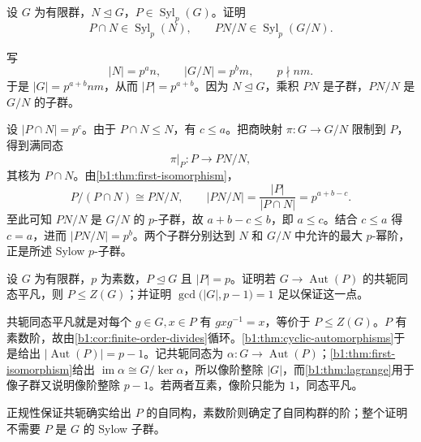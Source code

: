 \begin{exercise}\label{b1:ex:05-sylow-normal-quotient}
	设 \(G\) 为有限群，\(N\trianglelefteq G\)，\(P\in\operatorname{Syl}_p(G)\)。证明
	\[
		P\cap N\in\operatorname{Syl}_p(N),\qquad PN/N\in\operatorname{Syl}_p(G/N).
	\]
\end{exercise}
\begin{solution}
	写
	\[
		|N|=p^a n,\qquad |G/N|=p^b m, \qquad p\nmid nm.
	\]
	于是 \(|G|=p^{a+b}nm\)，从而 \(|P|=p^{a+b}\)。因为 \(N\trianglelefteq G\)，乘积 \(PN\) 是子群，\(PN/N\) 是 \(G/N\) 的子群。

	设 \(|P\cap N|=p^c\)。由于 \(P\cap N\leq N\)，有 \(c\leq a\)。把商映射 \(\pi:G\rightarrow G/N\) 限制到 \(P\)，得到满同态
	\[
		\pi|_P:P\longrightarrow PN/N,
	\]
	其核为 \(P\cap N\)。由\cref{b1:thm:first-isomorphism}，
	\[
		P/(P\cap N)\cong PN/N, \qquad |PN/N|=\frac{|P|}{|P\cap N|}=p^{a+b-c}.
	\]
	至此可知 \(PN/N\) 是 \(G/N\) 的 \(p\)-子群，故 \(a+b-c\leq b\)，即 \(a\leq c\)。结合 \(c\leq a\) 得 \(c=a\)，进而 \(|PN/N|=p^b\)。两个子群分别达到 \(N\) 和 \(G/N\) 中允许的最大 \(p\)-幂阶，正是所述 Sylow \(p\)-子群。
\end{solution}

\begin{exercise}\label{b1:ex:05-7}
	设 \(G\) 为有限群，\(p\) 为素数，\(P\trianglelefteq G\) 且 \(|P|=p\)。证明若 \(G\rightarrow\operatorname{Aut}(P)\) 的共轭同态平凡，则 \(P\leq Z(G)\)；并证明 \(\gcd\bigl(|G|,p-1\bigr)=1\) 足以保证这一点。
\end{exercise}
\begin{solution}
	共轭同态平凡就是对每个 \(g\in G,x\in P\) 有 \(gxg^{-1}=x\)，等价于 \(P\leq Z(G)\)。\(P\) 有素数阶，故由\cref{b1:cor:finite-order-divides}循环。\cref{b1:thm:cyclic-automorphisms}于是给出 \(\bigl|\operatorname{Aut}(P)\bigr|=p-1\)。记共轭同态为 \(\alpha:G\rightarrow\operatorname{Aut}(P)\)；\cref{b1:thm:first-isomorphism}给出 \(\operatorname{im}\alpha\cong G/\ker\alpha\)，所以像阶整除 \(|G|\)，而\cref{b1:thm:lagrange}用于像子群又说明像阶整除 \(p-1\)。若两者互素，像阶只能为 \(1\)，同态平凡。

	正规性保证共轭确实给出 \(P\) 的自同构，素数阶则确定了自同构群的阶；整个证明不需要 \(P\) 是 \(G\) 的 Sylow 子群。
\end{solution}

